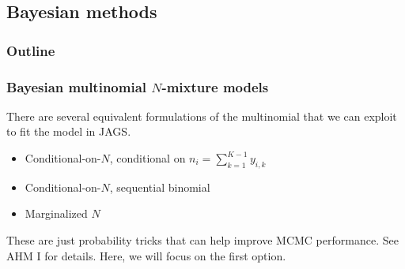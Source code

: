 \documentclass[color=usenames,dvipsnames]{beamer}\usepackage[]{graphicx}\usepackage[]{xcolor}
\begin{document}
\subsection{Bayesian methods}


\begin{frame}
  \frametitle{Outline}
  \Large
\end{frame}


\begin{frame}
  \frametitle{Bayesian multinomial $N$-mixture models}
  There are several equivalent formulations of the multinomial
  that we can exploit to fit the model in JAGS.
  \begin{itemize}
    \item Conditional-on-$N$, conditional on $n_i=\sum_{k=1}^{K-1} y_{i,k}$
    \item Conditional-on-$N$, sequential binomial
    \item Marginalized $N$
  \end{itemize}
  \pause
  \vfill
  These are just probability tricks that can help improve MCMC performance. See AHM I for details. Here, we will focus on the first option. \\
\end{frame}









\end{document}
